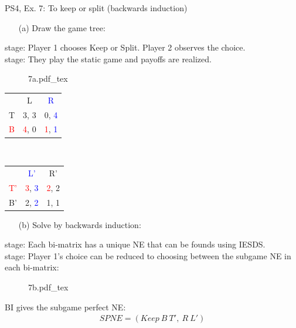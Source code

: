 \begin{frame}{PS4, Ex. 7: To keep or split (backwards induction)}
  \begin{multicols}{2}
    \begin{itemize}
      \item[(a)] Draw the game tree:
    \end{itemize}
     stage: Player 1 chooses Keep or Split. Player 2 observes the choice.\\\medskip
     stage: They play the static game and payoffs are realized.
    \begin{figure}[!h]
      \begin{center}
      \def\svgwidth{.5\columnwidth}
      {7a.pdf_tex}
      \end{center}
    \end{figure}
    \vspace{-14pt}
    \begin{table}
      \begin{tabular}{l|c|c|}
        \multicolumn{1}{c}{} & \multicolumn{1}{c}{L} & \multicolumn{1}{c}{\textcolor{blue}{R}} \\\cline{2-3}
        T & 3, 3 & 0, \textcolor{blue}{4} \\\cline{2-3}
        \textcolor{red}{B} & \textcolor{red}{4}, 0 & \textcolor{red}{1}, \textcolor{blue}{1} \\\cline{2-3}
        \end{tabular}\
        \begin{tabular}{l|c|c|}
          \multicolumn{1}{c}{} & \multicolumn{1}{c}{\textcolor{blue}{L'}} & \multicolumn{1}{c}{R'} \\\cline{2-3}
          \textcolor{red}{T'} & \textcolor{red}{3}, \textcolor{blue}{3} & \textcolor{red}{2}, 2 \\\cline{2-3}
          B' & 2, \textcolor{blue}{2} & 1, 1 \\\cline{2-3}
        \end{tabular}
    \end{table}
  \vfill\null \columnbreak
  \begin{itemize}
    \item[(b)] Solve by backwards induction:
  \end{itemize}
   stage: Each bi-matrix has a unique NE that can be founds using IESDS.\\\medskip
  \nth{1} stage: Player 1's choice can be reduced to choosing between the subgame NE in each bi-matrix:
  \begin{figure}[!h]
    \begin{center}
    \def\svgwidth{.5\columnwidth}
    {7b.pdf_tex}
    \end{center}
  \end{figure}
  BI gives the subgame perfect NE:
  \begin{align*}
    SPNE=(Keep\ B\ T',\ R\ L')
  \end{align*}
  \vfill\null
  \end{multicols}
\end{frame}

